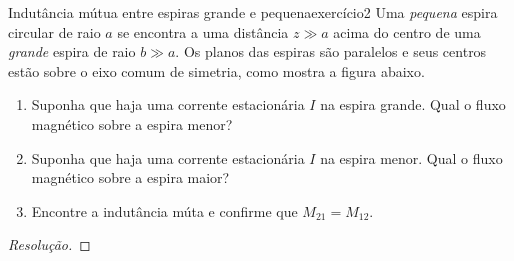 \begin{exercício}{Indutância mútua entre espiras grande e pequena}{exercício2}
    Uma \emph{pequena} espira circular de raio \(a\) se encontra a uma distância \(z \gg a\) acima do centro de uma \emph{grande} espira de raio \(b \gg a\). Os planos das espiras são paralelos e seus centros estão sobre o eixo comum de simetria, como mostra a figura abaixo.
    \begin{center}
    \end{center}
    \begin{enumerate}[label=(\alph*)]
        \item Suponha que haja uma corrente estacionária \(I\) na espira grande. Qual o fluxo magnético sobre a espira menor? 
        \item Suponha que haja uma corrente estacionária \(I\) na espira menor. Qual o fluxo magnético sobre a espira maior? 
        \item Encontre a indutância múta e confirme que \(M_{21} = M_{12}\). \todo[Recordamos que a indutância mútua entre os objetos \(1\) e \(2\), \(M_{21}\), é definida como a razão entre o fluxo sobre o objeto \(2\) devido ao campo magnético gerado pela corrente \(I_1\) do objeto \(1\), ou seja \(\Phi_{B_{2(1)}} = M_{21}I_1\).]
    \end{enumerate}
\end{exercício}
\begin{proof}[Resolução]

\end{proof}
